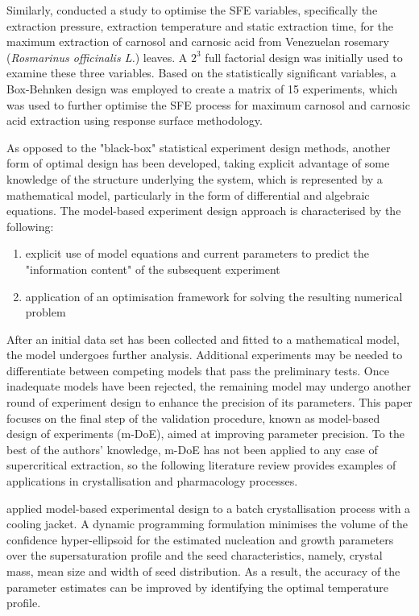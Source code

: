 \documentclass[a4paper,fleqn]{cas-dc}
\begin{document}
Similarly, \citet{Caldera2012} conducted a study to optimise the SFE variables, specifically the extraction pressure, extraction temperature and static extraction time, for the maximum extraction of carnosol and carnosic acid from Venezuelan rosemary (\textit{Rosmarinus officinalis L.}) leaves. A $2^3$ full factorial design was initially used to examine these three variables. Based on the statistically significant variables, a Box-Behnken design was employed to create a matrix of 15 experiments, which was used to further optimise the SFE process for maximum carnosol and carnosic acid extraction using response surface methodology.

As opposed to the "black-box" statistical experiment design methods, another form of optimal design has been developed, taking explicit advantage of some knowledge of the structure underlying the system, which is represented by a mathematical model, particularly in the form of differential and algebraic equations. The model-based experiment design approach is characterised by the following:

\begin{enumerate}
	\item explicit use of model equations and current parameters to predict the "information content" of the subsequent experiment
	\item application of an optimisation framework for solving the resulting numerical problem
\end{enumerate}

After an initial data set has been collected and fitted to a mathematical model, the model undergoes further analysis. Additional experiments may be needed to differentiate between competing models that pass the preliminary tests. Once inadequate models have been rejected, the remaining model may undergo another round of experiment design to enhance the precision of its parameters. This paper focuses on the final step of the validation procedure, known as model-based design of experiments (m-DoE), aimed at improving parameter precision. To the best of the authors' knowledge, m-DoE has not been applied to any case of supercritical extraction, so the following literature review provides examples of applications in crystallisation and pharmacology processes.

\citet{Chung2000} applied model-based experimental design to a batch crystallisation process with a cooling jacket. A dynamic programming formulation minimises the volume of the confidence hyper-ellipsoid for the estimated nucleation and growth parameters over the supersaturation profile and the seed characteristics, namely, crystal mass, mean size and width of seed distribution. As a result, the accuracy of the parameter estimates can be improved by identifying the optimal temperature profile.
\end{document}
